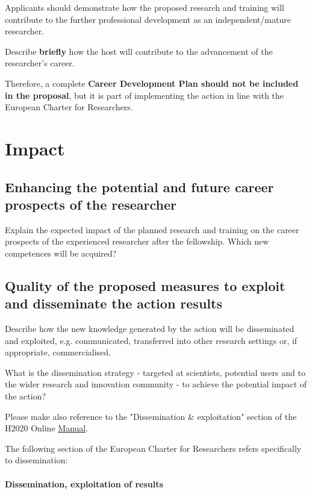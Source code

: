 \documentclass[a4paper,11pt]{article}
\begin{document}
Applicants should demonstrate how the proposed research and training will contribute to the further professional development as an independent/mature researcher.

Describe \textbf{briefly} how the host will contribute to the advancement of the researcher's career.

Therefore, a complete \textbf{Career Development Plan should not be included in the proposal}, but it is part of implementing the action in line with the European Charter for Researchers.

\section{Impact}
\label{sec:impact}

\subsection{Enhancing the potential and future career prospects of the researcher }
\label{sec:enhancement}

Explain the expected impact of the planned research and training on the career prospects of the experienced researcher after the fellowship. Which new competences will be acquired? 

\subsection{Quality of the proposed measures to exploit and disseminate the action results}

Describe how the new knowledge generated by the action will be disseminated and exploited, e.g. communicated, transferred into other research settings or, if appropriate, commercialised. 

What is the dissemination strategy - targeted at scientists, potential users and to the wider research and innovation community - to achieve the potential impact of the action?

Please make also reference to the "Dissemination \& exploitation" section of the H2020 Online \href{http://ec.europa.eu/research/participants/docs/h2020-funding-guide/grants/grant-management/dissemination-of-results_en.htm}{Manual}.

The following section of the European Charter for Researchers refers specifically to dissemination:


\paragraph{Dissemination, exploitation of results}
\end{document}
